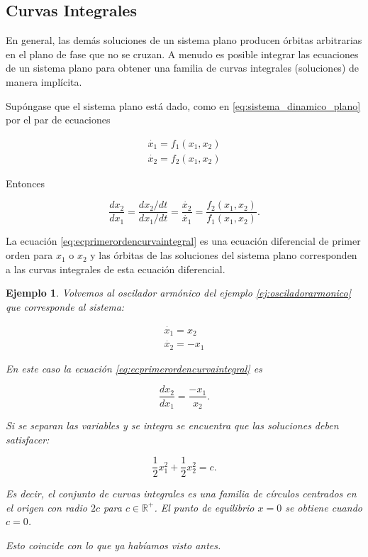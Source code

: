 \documentclass[11pt]{book}
\theoremstyle{definition}
\numberwithin{definition}{section}
\theoremstyle{theorem}
\numberwithin{theorem}{section}
\numberwithin{lemma}{section}
\numberwithin{corollary}{section}
\theoremstyle{plain}
\newtheorem{example}{Ejemplo}
\numberwithin{example}{section}
\newcommand{\R}{{\ensuremath{\mathbb{R}}}}
\begin{document}
\subsection{Curvas Integrales}

En general, las demás soluciones de un sistema plano producen órbitas arbitrarias en el plano de fase que no se cruzan.
A menudo es posible integrar las ecuaciones de un sistema plano para obtener una familia de curvas integrales (soluciones) de manera implícita.

Supóngase que el sistema plano está dado, como en \ref{eq:sistema_dinamico_plano} por el par de ecuaciones

$$
\begin{array}{l}
	\dot{x_1} = f_1(x_1,x_2) \\
	\dot{x_2} = f_2(x_1,x_2)
\end{array}
$$

Entonces

\begin{equation} \label{eq:ecprimerordencurvaintegral}
	\dfrac{dx_2}{dx_1} = \frac{dx_2/dt}{dx_1/dt} = \frac{\dot{x_2}}{\dot{x_1}} = \dfrac{f_2(x_1,x_2)}{f_1(x_1,x_2)}.
\end{equation}

La ecuación \ref{eq:ecprimerordencurvaintegral} es una ecuación diferencial de primer orden para $x_1$ o $x_2$ y las órbitas de las soluciones del sistema plano corresponden a las curvas integrales de esta ecuación diferencial.

\begin{example}
Volvemos al oscilador armónico del ejemplo \ref{ej:osciladorarmonico} que corresponde al sistema:

$$
\begin{array}{l}
	\dot{x_1} = x_2 \\
	\dot{x_2} = -x_1
\end{array}
$$

En este caso la ecuación \ref{eq:ecprimerordencurvaintegral} es

$$ \dfrac{dx_2}{dx_1} = \frac{-x_1}{x_2}.$$

Si se separan las variables y se integra se encuentra que las soluciones deben satisfacer:

$$ \frac{1}{2}x_1^2 + \frac{1}{2}x_2^2 = c.$$

Es decir, el conjunto de curvas integrales es una familia de círculos centrados en el origen con radio $2c$ para $c \in \R^+$. El punto de equilibrio $x = 0$ se obtiene cuando $c = 0$.

Esto coincide con lo que ya habíamos visto antes.
\end{example}
\end{document}
